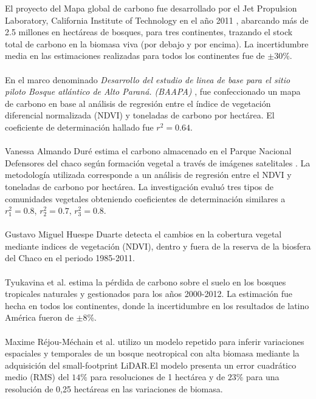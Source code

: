 El proyecto del Mapa global de carbono fue desarrollado por el Jet Propulsion Laboratory, California Institute of Technology en el a\~{n}o 2011 \cite{saatchi2011benchmark}, abarcando m\'as de 2.5 millones en hect\'areas de bosques, para tres continentes, trazando el stock total de carbono en la biomasa viva (por debajo y por encima). La incertidumbre media en las estimaciones realizadas para todos los continentes fue de $ \pm 30$\%.\\~\\
En el marco denominado \textit{Desarrollo del estudio de linea de base para el sitio piloto Bosque atl\'antico de Alto Paran\'a. (BAAPA)} \cite{BAAPA2013}, fue confeccionado un mapa de carbono en base al an\'alisis de regresi\'on entre el \'indice de vegetaci\'on diferencial normalizada (NDVI) y toneladas de carbono por hect\'area. El coeficiente de determinaci\'on hallado fue $ r^{2}=0.64 $.\\~\\
 Vanessa Almando Dur\'e \cite{kris2014estimacion} estima el carbono almacenado en el Parque Nacional Defensores del chaco seg\'un formaci\'on vegetal a trav\'es de im\'agenes satelitales . La metodolog\'ia utilizada corresponde a un an\'alisis de regresi\'on entre el NDVI y toneladas de carbono por hect\'area. La investigaci\'on evalu\'o tres tipos de comunidades vegetales obteniendo coeficientes de determinaci\'on similares a $ r_{1}^{2}=0.8$, $ r_{2}^{2}=0.7 $, $r_{3}^{2}=0.8 $.\\~\\
 Gustavo Miguel Huespe Duarte \cite{gustavo2012deteccion} detecta el cambios en la cobertura vegetal mediante indices de vegetaci\'on (NDVI), dentro y fuera de la reserva de la biosfera del Chaco en el periodo 1985-2011.\\~\\
Tyukavina et al. \cite{tyukavina2015aboveground} estima la p\'erdida de carbono sobre el suelo en los bosques tropicales naturales y gestionados para los a\~{n}os 2000-2012. La estimaci\'on fue hecha en todos los continentes, donde la incertidumbre en los resultados de latino América fueron de $ \pm 8 $\%.\\~\\
Maxime R\'ejou-M\'echain et al. \cite{rejou2015using} utilizo un modelo repetido para inferir variaciones espaciales y temporales de un bosque neotropical con alta biomasa mediante la adquisici\'on del small-footprint LiDAR.El modelo presenta un error cuadr\'atico medio (RMS) del $ 14\% $ para resoluciones de 1 hect\'area y de $ 23\% $ para una resoluci\'on de 0,25 hect\'areas en las variaciones de biomasa.\\~\\
